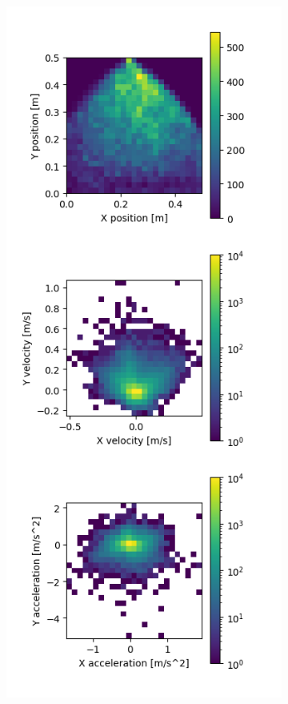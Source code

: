 \begin{figure}[h]
     \centering
     \begin{subfigure}[b]{0.48\textwidth}
         \centering
         \includegraphics[width=\textwidth]{images/dataset_distribution.png}

\end{subfigure}
\end{figure}
